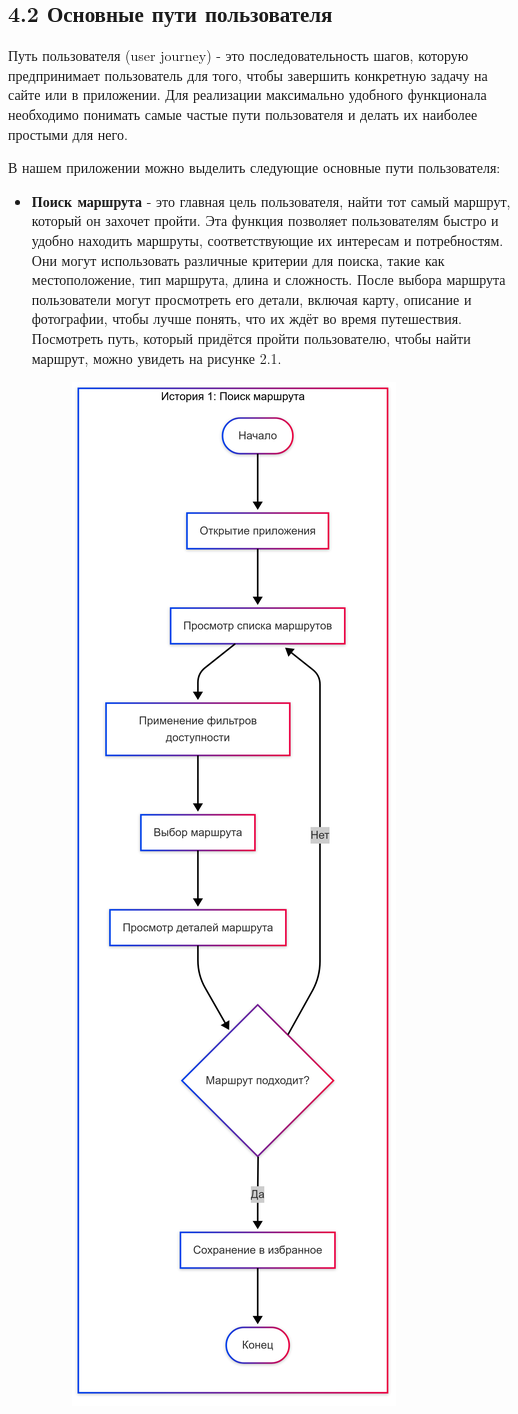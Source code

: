 


\subsection*{4.2 Основные пути пользователя}

Путь пользователя (user journey) - это последовательность шагов, которую предпринимает пользователь для того, чтобы завершить конкретную задачу на сайте или в приложении. Для реализации максимально удобного функционала необходимо понимать самые частые пути пользователя и делать их наиболее простыми для него.

В нашем приложении можно выделить следующие основные пути пользователя:

\begin{itemize}
    \item \textbf{Поиск маршрута} - это главная цель  пользователя, найти тот самый маршрут, который он захочет пройти. Эта функция позволяет пользователям быстро и удобно находить маршруты, соответствующие их интересам и потребностям. Они могут использовать различные критерии для поиска, такие как местоположение, тип маршрута, длина и сложность. После выбора маршрута пользователи могут просмотреть его детали, включая карту, описание и фотографии, чтобы лучше понять, что их ждёт во время путешествия. Посмотреть путь, который придётся пройти пользователю, чтобы найти маршрут, можно увидеть на рисунке 2.1.
    \begin{figure}[H]
        \centering
        \includegraphics[width=0.4\linewidth]{Images/mobile_logic/история_поиск_маршрута-2025-04-13-175239.png}

\end{figure}
\end{itemize}
